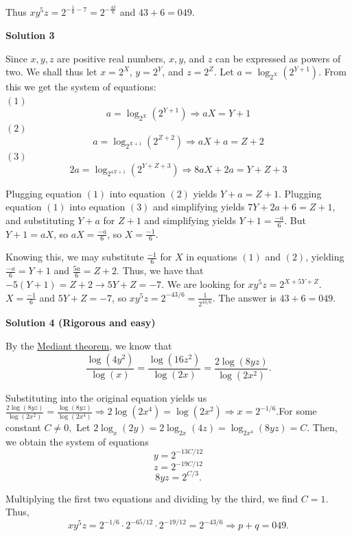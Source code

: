 \begin{enumerate}
 Thus $xy^5z=2^{-\frac{1}{6}-7}=2^{-\frac{43}{6}}$ and $43+6=\boxed{049}$.

 



\textbf{Solution 3}

Since $x, y, z$ are positive real numbers, $x, y$, and $z$ can be expressed as powers of two.  We shall thus let $x = 2^X$, $y = 2^Y$, and $z = 2^Z$.  Let $a = \log_{2^X}(2^{Y+1})$.  From this we get the system of equations: 
 \[\]$(1)$
 \[a = \log_{2^X}(2^{Y+1}) \Rightarrow aX = Y + 1\]$(2)$
 \[a = \log_{2^{X + 1}}(2^{Z + 2}) \Rightarrow aX + a = Z + 2\]$(3)$
 \[2a = \log_{2^{4X + 1}}(2^{Y + Z + 3}) \Rightarrow 8aX + 2a = Y + Z + 3\]

 Plugging equation $(1)$ into equation $(2)$ yields $Y + a = Z + 1$.  Plugging equation $(1)$ into equation $(3)$ and simplifying yields $7Y + 2a + 6 = Z + 1$, and substituting $Y + a$ for $Z + 1$ and simplifying yields $Y + 1 = \frac{-a}{6}$.  But $Y + 1 = aX$, so $aX =  \frac{-a}{6}$, so $X = \frac{-1}{6}$.

 Knowing this, we may substitute $\frac{-1}{6}$ for $X$ in equations $(1)$ and $(2)$, yielding $\frac{-a}{6} = Y + 1$ and $\frac{5a}{6} = Z + 2$.  Thus, we have that $-5(Y + 1) = Z + 2 \rightarrow 5Y + Z = -7$.  We are looking for $xy^5z = 2^{X+ 5Y + Z}$. $X = \frac{-1}{6}$ and $5Y + Z = -7$, so $xy^5z = 2^{-43/6} = \frac{1}{2^{43/6}}$.  The answer is $43+6=\boxed{049}$.

 



\textbf{Solution 4 (Rigorous and easy)}

By the \href{https://artofproblemsolving.com/wiki/index.php?title=Mediant\_theorem}{Mediant theorem}, we know that
 \[\frac{\log (4y^2)}{\log (x)} = \frac{\log (16z^2)}{\log (2x)} = \frac{2\log (8yz)}{\log (2x^2)}.\] 

 Substituting into the original equation yields us $\frac{2\log (8yz)}{\log (2x^2)} = \frac{\log (8yz)}{\log (2x^4)} \Rightarrow 2\log (2x^4) = \log (2x^2) \Rightarrow x=2^{-1/6}.$For some constant $C\not= 0,$ Let $2\log_{x}(2y) = 2\log_{2x}(4z) = \log_{2x^4}(8yz) = C.$ Then, we obtain the system of equations
 \[y=2^{-13C/12}\]
 \[z=2^{-19C/12}\]
 \[8yz=2^{C/3}.\]

 Multiplying the first two equations and dividing by the third, we find $C=1.$ Thus, 
 \[xy^5z=2^{-1/6} \cdot 2^{-65/12} \cdot 2^{-19/12}=2^{-43/6} \Rightarrow p+q=\boxed{049}.\]





\end{enumerate}
